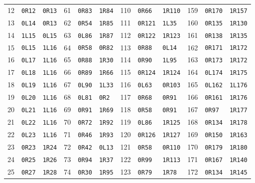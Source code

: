\begin{center}
\begin{tabular}{@{}rll@{\quad}rll@{\quad}rll@{\quad}rll@{}}
12 & \texttt{0R12} & \texttt{0R13} & 61 & \texttt{0R83} & \texttt{1R84} & 110 & \texttt{0R66} & \texttt{1R110} & 159 & \texttt{0R170} & \texttt{1R157}\\
13 & \texttt{0L14} & \texttt{0R13} & 62 & \texttt{0R54} & \texttt{1R85} & 111 & \texttt{0R121} & \texttt{1L35} & 160 & \texttt{0R135} & \texttt{1R130}\\
14 & \texttt{1L15} & \texttt{0L15} & 63 & \texttt{0L86} & \texttt{1R87} & 112 & \texttt{0R122} & \texttt{1R123} & 161 & \texttt{0R138} & \texttt{1R135}\\
15 & \texttt{0L15} & \texttt{1L16} & 64 & \texttt{0R58} & \texttt{0R82} & 113 & \texttt{0R88} & \texttt{0L14} & 162 & \texttt{0R171} & \texttt{1R172}\\
16 & \texttt{0L17} & \texttt{1L16} & 65 & \texttt{0R88} & \texttt{1R30} & 114 & \texttt{0R90} & \texttt{1L95} & 163 & \texttt{0R173} & \texttt{1R172}\\
17 & \texttt{0L18} & \texttt{1L16} & 66 & \texttt{0R89} & \texttt{1R66} & 115 & \texttt{0R124} & \texttt{1R124} & 164 & \texttt{0L174} & \texttt{1R175}\\
18 & \texttt{0L19} & \texttt{1L16} & 67 & \texttt{0L90} & \texttt{1L33} & 116 & \texttt{0L63} & \texttt{0R103} & 165 & \texttt{0L162} & \texttt{1L176}\\
19 & \texttt{0L20} & \texttt{1L16} & 68 & \texttt{0L81} & \texttt{0R2} & 117 & \texttt{0R68} & \texttt{0R91} & 166 & \texttt{0R161} & \texttt{1R176}\\
20 & \texttt{0L21} & \texttt{1L16} & 69 & \texttt{0R91} & \texttt{1R69} & 118 & \texttt{0R58} & \texttt{0R91} & 167 & \texttt{0R97} & \texttt{1R177}\\
21 & \texttt{0L22} & \texttt{1L16} & 70 & \texttt{0R72} & \texttt{1R92} & 119 & \texttt{0L86} & \texttt{1R125} & 168 & \texttt{0R134} & \texttt{1R178}\\
22 & \texttt{0L23} & \texttt{1L16} & 71 & \texttt{0R46} & \texttt{1R93} & 120 & \texttt{0R126} & \texttt{1R127} & 169 & \texttt{0R150} & \texttt{1R163}\\
23 & \texttt{0R23} & \texttt{1R24} & 72 & \texttt{0R42} & \texttt{0L13} & 121 & \texttt{0R58} & \texttt{0R110} & 170 & \texttt{0R179} & \texttt{1R180}\\
24 & \texttt{0R25} & \texttt{1R26} & 73 & \texttt{0R94} & \texttt{1R37} & 122 & \texttt{0R99} & \texttt{1R113} & 171 & \texttt{0R167} & \texttt{1R140}\\
25 & \texttt{0R27} & \texttt{1R28} & 74 & \texttt{0R30} & \texttt{1R95} & 123 & \texttt{0R79} & \texttt{1R78} & 172 & \texttt{0R134} & \texttt{1R145}\\

\end{tabular}
\end{center}
